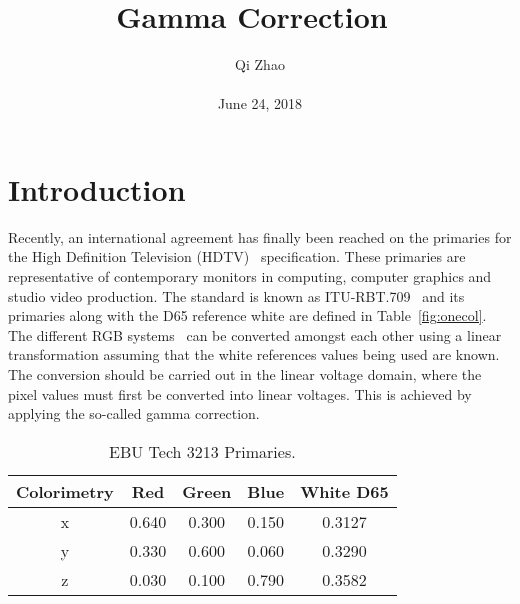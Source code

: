 \documentclass[10pt,twocolumn,letterpaper]{article}
\begin{document}
\title{Gamma Correction~\cite{Farid2001Blind}}
\author{Qi Zhao\\\\June 24, 2018}

\maketitle
\section{Introduction}
Recently, an international agreement has finally been reached on the primaries for the High Definition Television (HDTV)~\cite{Mertz1939High} specification. These primaries are representative of contemporary monitors in computing, computer graphics and studio video production. The standard is known as ITU-RBT.709~\cite{Susstrunk2001Chromatic} and its primaries along with the D65 reference white are defined in Table~\ref{fig:onecol}. The different RGB systems~\cite{Kim2013Depth} can be converted amongst each other using a linear transformation assuming that the white references values being used are known. The conversion should be carried out in the linear voltage domain, where the pixel values must first be converted into linear voltages. This is achieved by applying the so-called gamma correction.
\begin{small}
\begin{table}[htbp]
\begin{center}
\begin{tabular}{ccccc}
\hline
Colorimetry &Red & Green &Blue&White D65 \\
\hline
 x & 0.640&0.300& 0.150&0.3127\\

y & 0.330&0.600&0.060&0.3290 \\

z & 0.030&0.100&0.790&0.3582\\
\hline
\end{tabular}
\end{center}
\caption{EBU Tech 3213 Primaries.}
\end{table}
\end{small}
\end{document}
